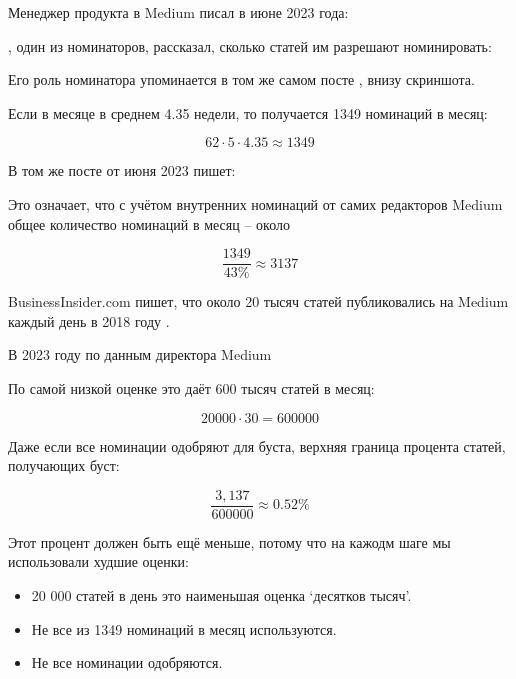 Менеджер продукта в Medium писал в июне 2023 года:


\MrMcCarty, один из номинаторов, рассказал, сколько статей им разрешают номинировать:


Его роль номинатора упоминается в том же самом посте \MrsStallingsT
{}, внизу скриншота.

Если в месяце в среднем 4.35 недели, то получается 1349 номинаций в месяц:

\[
    62 \cdot 5 \cdot 4.35 \approx 1349
\]

В том же посте от июня 2023 \MrsStallings пишет:


Это означает, что с учётом внутренних номинаций от самих редакторов Medium
общее количество номинаций в месяц -- около

\[
    \frac{1349}{43\%} \approx 3137
\]

BusinessInsider.com пишет,
что около 20 тысяч статей публиковались на Medium каждый день в 2018 году .

В 2023 году по данным директора Medium


По самой низкой оценке это даёт 600 тысяч статей в месяц:

\[
    20 000 \cdot 30 = 600 000
\]

Даже если все номинации одобряют для буста, верхняя граница процента статей, получающих буст:

\[
    \frac{3,137}{600 000} \approx 0.52\%
\]

Этот процент должен быть ещё меньше, потому что на кажодм шаге мы использовали худшие оценки:

\vspace{-0.5\baselineskip}
\vspace{-0.5\baselineskip}
\begin{itemize}[nosep]
    \item 20 000 статей в день это наименьшая оценка `десятков тысяч'.
    \item Не все из 1349 номинаций в месяц используются.
    \item Не все номинации одобряются.
\end{itemize}

